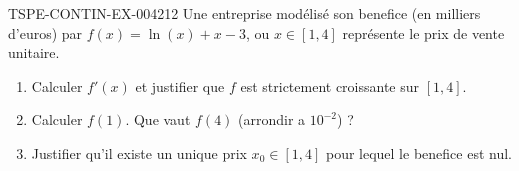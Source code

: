\begin{exercice}{TSPE-CONTIN-EX-004}{2}{12}
Une entreprise modélisé son benefice (en milliers d'euros) par $f(x) = \ln(x) + x - 3$, ou $x \in [1, 4]$ représente le prix de vente unitaire.
\begin{enumerate}
  \item Calculer $f'(x)$ et justifier que $f$ est strictement croissante sur $[1, 4]$.
  \item Calculer $f(1)$. Que vaut $f(4)$ (arrondir a $10^{-2}$) ?
  \item Justifier qu'il existe un unique prix $x_0 \in [1, 4]$ pour lequel le benefice est nul.
\end{enumerate}
\end{exercice}

